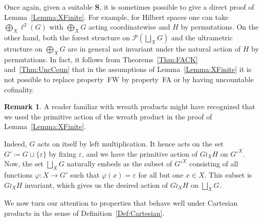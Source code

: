 \documentclass[a4paper]{article}
\theoremstyle{definition}
\newtheorem{rem}[lem]{Remark}
\newcommand*{\category}[1]{\textbf{#1}}
\newcommand*{\CatS}{\category{S}}
\newcommand*{\FW}{FW}
\newcommand*{\FA}{FA}
\newcommand*{\powerset}[1]{\mathcal P(#1)}
\begin{document}
%
%
Once again, given a suitable \CatS, it is sometimes possible to give a direct proof of Lemma~\ref{Lemma:XFinite}.
For example, for Hilbert spaces one can take $\bigoplus_X\ell^2(G)$ with $\bigoplus_XG$ acting coordinatewise and $H$ by permutations.
On the other hand, both the forest structure on $\powerset{\bigsqcup_XG}$ and the ultrametric structure on $\bigoplus_XG$ are in general not invariant under the natural action of $H$ by permutations.
In fact, it follows from Theorems~\ref{Thm:FACK} and~\ref{Thm:UncCoun} that in the assumptions of Lemma~\ref{Lemma:XFinite} it is not possible to replace property~\FW{} by property~\FA{} or by having uncountable cofinality.
%
%
\begin{rem}\label{Rem:Actionsb}
A reader familiar with wreath products might have recognized that we used the primitive action of the wreath product in the proof of Lemma~\ref{Lemma:XFinite}.

Indeed, $G$ acts on itself by left multiplication.
It hence acts on the set $G'\coloneqq G\sqcup\{\varepsilon\}$ by fixing $\varepsilon$, and we have the primitive action of $G\wr_{X} H$ on $G'^X$.
Now, the set $\bigsqcup_XG$ naturally embeds as the subset of $G'^X$ consisting of all functions $\varphi\colon X\to G'$ such that $\varphi(x)=\varepsilon$ for all but one $x\in X$.
This subset is $G\wr_{X} H$ invariant, which gives us the desired action of $G\wr_{X} H$ on $\bigsqcup_XG$.
\end{rem}
%
%
We now turn our attention to properties that behave well under Cartesian products in the sense of Definition~\ref{Def:Cartesian}.
\end{document}
